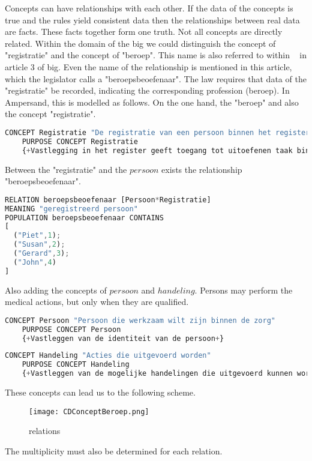Concepts can have relationships with each other.
If the data of the concepts is true and the rules yield consistent data then the relationships between real data are facts.
These facts together form one truth.
Not all concepts are directly related.
Within the domain of the \acrshort{big} we could distinguish the concept of "registratie" and the concept of "beroep".
This name is also referred to within ~ in article 3 of \acrshort{big}.
Even the name of the relationship is mentioned in this article, which the legislator calls a "beroepsbeoefenaar".
The law requires that data of the "registratie" be recorded, indicating the corresponding profession (beroep).
In Ampersand, this is modelled as follows.
On the one hand, the "beroep" and also the concept "registratie".
\begin{lstlisting}[language=Octave] 
    CONCEPT Registratie "De registratie van een persoon binnen het register" 
    PURPOSE CONCEPT Registratie 
    {+Vastlegging in het register geeft toegang tot uitoefenen taak binnen de gezondheidszorg+}
\end{lstlisting}
Between the "registratie" and the $persoon$ exists the relationship "beroepsbeoefenaar".
\begin{lstlisting}[language=Octave] 
RELATION beroepsbeoefenaar [Persoon*Registratie] 
MEANING "geregistreerd persoon"
POPULATION beroepsbeoefenaar CONTAINS 
[
  ("Piet",1);
  ("Susan",2);
  ("Gerard",3);
  ("John",4)
]\end{lstlisting}
Also adding the concepts of $persoon$ and $handeling$.
Persons may perform the medical actions, but only when they are qualified.
\begin{lstlisting}[language=Octave] 
    CONCEPT Persoon "Persoon die werkzaam wilt zijn binnen de zorg"
    PURPOSE CONCEPT Persoon 
    {+Vastleggen van de identiteit van de persoon+}
\end{lstlisting}
\begin{lstlisting}[language=Octave] 
    CONCEPT Handeling "Acties die uitgevoerd worden" 
    PURPOSE CONCEPT Handeling 
    {+Vastleggen van de mogelijke handelingen die uitgevoerd kunnen worden binnen de zorg+}
\end{lstlisting}
These concepts can lead us to the following scheme.
\begin{figure}[H] 
\texttt{[image: CDConceptBeroep.png]}
\centering
\caption{relations}
\label{fig:relations}
\end{figure}
The multiplicity must also be determined for each relation.

